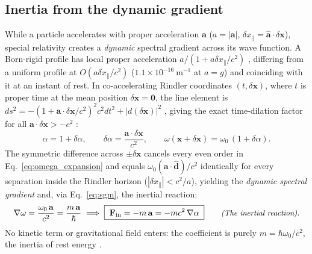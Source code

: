 \documentclass[aps,prd,onecolumn,tightenlines,nofootinbib,notitlepage,10pt,floatfix]{revtex4-2}
\theoremstyle{indentedtheorem}
\begin{document}
\subsection{Inertia from the dynamic gradient}
\label{sec:inertia}

While a particle accelerates with proper acceleration $\mathbf{a}$ ($a=|\mathbf{a}|$, $\delta x_\parallel=\hat{\mathbf{a}}\cdot\delta\mathbf{x}$), special relativity creates a \emph{dynamic} spectral gradient across its wave function. A Born-rigid profile has local proper acceleration $a/(1+a\delta x_\parallel/c^2)$ \citep{Born1909Theorie,Moller1952Theory,Rindler1966Kruskal}, differing from a uniform profile at $O(a\delta x_\parallel/c^2)$ ($1.1\times 10^{-16}~\text{m}^{-1}$ at $a=g$) and coinciding with it at an instant of rest. In co-accelerating Rindler coordinates $(t,\delta\mathbf{x})$, where $t$ is proper time at the mean position $\delta\mathbf{x}=\mathbf{0}$, the line element is $ds^2=-(1+\mathbf{a}\cdot\delta\mathbf{x}/c^2)^2c^2dt^2+|d(\delta\mathbf{x})|^2$ \citep{Rindler1966Kruskal,MTW1973Gravitation}, giving the exact time-dilation factor for all $\mathbf{a}\cdot\delta\mathbf{x}>-c^2$ \citep{Einstein1907Relativitatsprinzip,Einstein1911Influence,Doppler1842Farbige}:
\begin{equation}
    \alpha = 1 + \delta\alpha , \qquad \delta\alpha = \frac{\mathbf{a}\cdot\delta\mathbf{x}}{c^2} , \qquad \omega(\mathbf{x}+\delta\mathbf{x}) = \omega_0\,(1+\delta\alpha) .
    \label{eq:alpha_rindler}
\end{equation}
The symmetric difference across $\pm\delta\mathbf{x}$ cancels every even order in Eq.~\eqref{eq:omega_expansion} and equals $\omega_0(\mathbf{a}\cdot\hat{\mathbf{d}})/c^2$ identically for every separation inside the Rindler horizon ($|\delta x_\parallel|<c^2/a$), yielding the \emph{dynamic spectral gradient} and, via Eq.~\eqref{eq:sgm}, the inertial reaction:
\begin{equation}
    \nabla\omega = \frac{\omega_0\,\mathbf{a}}{c^2} = \frac{m\,\mathbf{a}}{\hbar} \implies \boxed{\;\mathbf{F}_\text{in} = -m\,\mathbf{a} = -mc^2\,\nabla\alpha\;} \qquad \text{\small\itshape (The inertial reaction)} .
    \label{eq:inertia}
\end{equation}
No kinetic term or gravitational field enters: the coefficient is purely $m=\hbar\omega_0/c^2$, the inertia of rest energy \citep{Einstein1905Inertia}.
\end{document}
